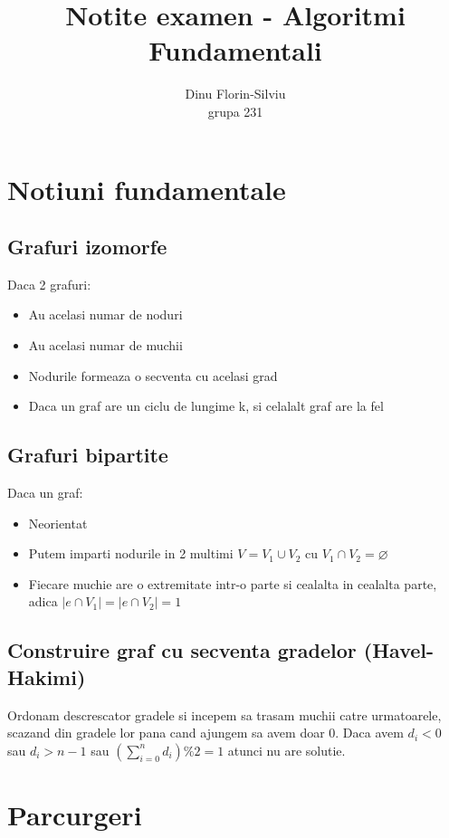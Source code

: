 \documentclass{article}
\title{Notite examen - Algoritmi Fundamentali}
\date{}
\author{Dinu Florin-Silviu \\ grupa 231}
\begin{document}
\maketitle
\tableofcontents

\newpage
{}

\section{Notiuni fundamentale}
\subsection*{Grafuri izomorfe} Daca 2 grafuri:
\begin{itemize}
    \item Au acelasi numar de noduri
    \item Au acelasi numar de muchii
    \item Nodurile formeaza o secventa cu acelasi grad
    \item Daca un graf are un ciclu de lungime k, si celalalt graf are la fel
\end{itemize}

\subsection*{Grafuri bipartite} Daca un graf:
\begin{itemize}
    \item Neorientat
    \item Putem imparti nodurile in 2 multimi $V=V_1 \cup V_2$ cu $V_1 \cap V_2 = \varnothing$
    \item Fiecare muchie are o extremitate intr-o parte si cealalta in cealalta parte, adica $|e \cap V_1| = |e \cap V_2| = 1$
\end{itemize}

\subsection*{Construire graf cu secventa gradelor (Havel-Hakimi)} Ordonam descrescator gradele si incepem sa trasam muchii catre urmatoarele, scazand din gradele lor pana cand ajungem sa avem doar 0. Daca avem $d_i<0$ sau $d_i>n-1$ sau $(\sum_{i=0}^{n} d_i) \% 2 = 1$ atunci nu are solutie.

\section{Parcurgeri}
\end{document}
